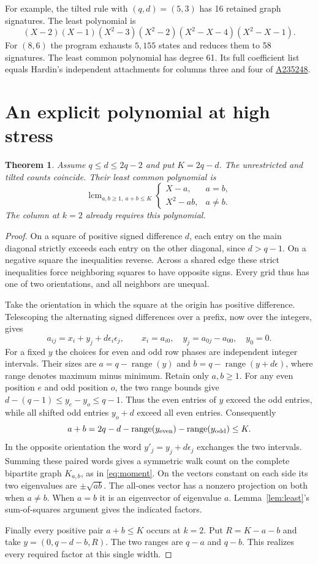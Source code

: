 \documentclass[11pt,letterpaper]{article}
\newtheorem{theorem}{Theorem}[section]
\newcommand{\seqid}[1]{\href{https://oeis.org/A#1}{A#1}}
\newcommand{\lcm}{\operatorname{lcm}}
\newcommand{\ran}{\operatorname{range}}
\begin{document}
For example, the tilted rule with $(q,d)=(5,3)$ has 16 retained graph signatures. The least polynomial is
\[
 (X-2)(X-1)(X^2-3)(X^2-2)(X^2-X-4)(X^2-X-1).
\]
For $(8,6)$ the program exhausts $5{,}155$ states and reduces them to 58 signatures. The least common polynomial has degree 61. Its full coefficient list equals Hardin's independent attachments for columns three and four of \seqid{235248}.

\clearpage
\section{An explicit polynomial at high stress}\label{sec:high}

\begin{theorem}
Assume $q\le d\le 2q-2$ and put $K=2q-d$. The unrestricted and tilted counts coincide. Their least common polynomial is
\[
 \lcm_{a,b\ge1,\ a+b\le K}
 \begin{cases}X-a,&a=b,\\ X^2-ab,&a\ne b.\end{cases}
\]
The column at $k=2$ already requires this polynomial.
\end{theorem}

\begin{proof}
On a square of positive signed difference $d$, each entry on the main diagonal strictly exceeds each entry on the other diagonal, since $d>q-1$. On a negative square the inequalities reverse. Across a shared edge these strict inequalities force neighboring squares to have opposite signs. Every grid thus has one of two orientations, and all neighbors are unequal.

Take the orientation in which the square at the origin has positive difference. Telescoping the alternating signed differences over a prefix, now over the integers, gives
\[
 a_{ij}=x_i+y_j+d\epsilon_i\epsilon_j,\qquad
 x_i=a_{i0},\quad y_j=a_{0j}-a_{00},\quad y_0=0.
\]
For a fixed $y$ the choices for even and odd row phases are independent integer intervals. Their sizes are $a=q-\ran(y)$ and $b=q-\ran(y+d\epsilon)$, where range denotes maximum minus minimum. Retain only $a,b\ge1$. For any even position $e$ and odd position $o$, the two range bounds give $d-(q-1)\le y_e-y_o\le q-1$. Thus the even entries of $y$ exceed the odd entries, while all shifted odd entries $y_o+d$ exceed all even entries. Consequently
\[
 a+b=2q-d-\ran(y_{\rm even})-\ran(y_{\rm odd})\le K .
\]
In the opposite orientation the word $y'_j=y_j+d\epsilon_j$ exchanges the two intervals. Summing these paired words gives a symmetric walk count on the complete bipartite graph $K_{a,b}$, as in \eqref{eq:moment}. On the vectors constant on each side its two eigenvalues are $\pm\sqrt{ab}$. The all-ones vector has a nonzero projection on both when $a\ne b$. When $a=b$ it is an eigenvector of eigenvalue $a$. Lemma~\ref{lem:least}'s sum-of-squares argument gives the indicated factors.

Finally every positive pair $a+b\le K$ occurs at $k=2$. Put $R=K-a-b$ and take $y=(0,q-d-b,R)$. The two ranges are $q-a$ and $q-b$. This realizes every required factor at this single width.
\end{proof}
\end{document}
